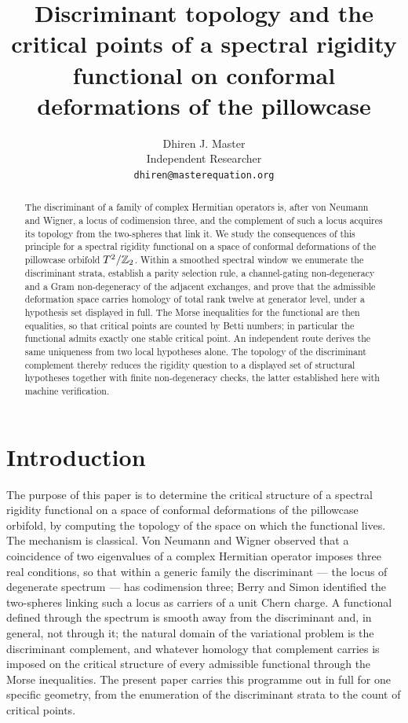\documentclass[11pt]{article}
\title{Discriminant topology and the critical points of a spectral
rigidity functional on conformal deformations of the pillowcase}
\author{Dhiren J. Master\\[2pt]
\normalsize Independent Researcher\\[1pt]
\normalsize \texttt{dhiren@masterequation.org}}
\date{}
\numberwithin{equation}{section}
\theoremstyle{plain}
\theoremstyle{definition}
\theoremstyle{remark}
\begin{document}
\maketitle

\begin{abstract}
\noindent
The discriminant of a family of complex Hermitian operators is,
after von Neumann and Wigner, a locus of codimension three, and the
complement of such a locus acquires its topology from the
two-spheres that link it. We study the consequences of this
principle for a spectral rigidity functional on a space of conformal
deformations of the pillowcase orbifold $T^{2}/\mathbb{Z}_2$. Within a
smoothed spectral window we enumerate the discriminant strata,
establish a parity selection rule, a channel-gating non-degeneracy
and a Gram non-degeneracy of the adjacent exchanges, and prove that
the admissible deformation space
carries homology of total rank twelve at generator level, under a
hypothesis set displayed in full. The Morse inequalities for the
functional are then equalities, so that critical points are counted
by Betti numbers; in particular the functional admits exactly one
stable critical point. An independent route derives the same
uniqueness from two local hypotheses alone. The topology of the
discriminant complement thereby reduces the rigidity question to a
displayed set of structural hypotheses together with finite
non-degeneracy checks, the latter established here with machine
verification.
\end{abstract}

\section{Introduction}\label{sec:intro}

The purpose of this paper is to determine the critical structure of
a spectral rigidity functional on a space of conformal deformations
of the pillowcase orbifold, by computing the topology of the space
on which the functional lives. The mechanism is classical. Von
Neumann and Wigner \cite{vonNeumannWigner1929} observed that a
coincidence of two eigenvalues of a complex Hermitian operator
imposes three real conditions, so that within a generic family the
discriminant --- the locus of degenerate spectrum --- has
codimension three; Berry \cite{Berry1984} and Simon
\cite{Simon1983} identified the two-spheres linking such a locus as
carriers of a unit Chern charge. A functional defined through the
spectrum is smooth away from the discriminant and, in general, not
through it; the natural domain of the variational problem is the
discriminant complement, and whatever homology that complement
carries is imposed on the critical structure of every admissible
functional through the Morse inequalities. The present paper
carries this programme out in full for one specific geometry, from
the enumeration of the discriminant strata to the count of critical
points.
\end{document}
